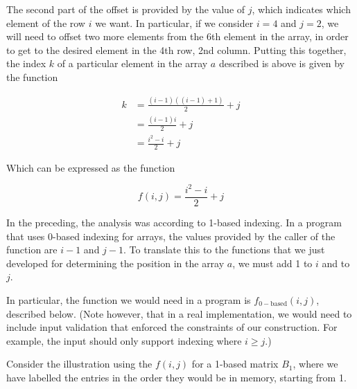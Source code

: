 \documentclass[12pt,letterpaper,final]{report}
\begin{document}
\begin{enumerate}
        The second part of the offset is provided by the value of $j$, which indicates which element of the row $i$ we want. In particular, if we consider $i = 4$ and $j = 2$, we will need to offset two more elements from the 6th element in the array, in order to get to the desired element in the 4th row, 2nd column. Putting this together, the index $k$ of a particular element in the array $a$ described is above is given by the function

        \begin{align*}
          k & = \frac{(i - 1)((i - 1) + 1)}{2} + j \\
            & = \frac{(i - 1)i}{2} + j             \\
            & = \frac{i^2 - i}{2} + j
        \end{align*}

        Which can be expressed as the function

        \begin{equation}
          f(i,j) = \frac{i^2 - i}{2} + j
        \end{equation}

        In the preceding, the analysis was according to 1-based indexing. In a program that uses 0-based indexing for arrays, the values provided by the caller of the function are $i-1$ and $j-1$. To translate this to the functions that we just developed for determining the position in the array $a$, we must add 1 to $i$ and to $j$.

        In particular, the function we would need in a program is $f_{0-\text{based}}(i,j)$, described below. (Note however, that in a real implementation, we would need to include input validation that enforced the constraints of our construction. For example, the input should only support indexing where $i \ge j$.)

        Consider the illustration using the $f(i,j)$ for a 1-based matrix $B_1$, where we have labelled the entries in the order they would be in memory, starting from 1.


\end{enumerate}
\end{document}
